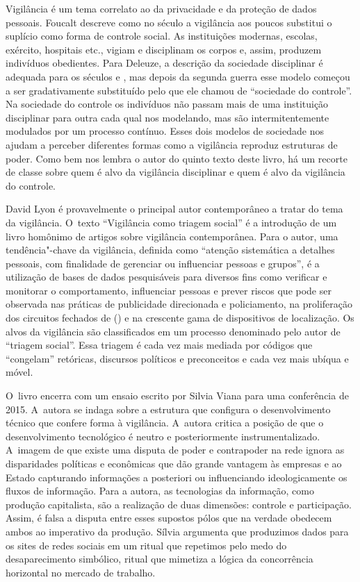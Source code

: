 Vigilância é um tema correlato ao da privacidade e da proteção de dados
pessoais. Foucalt descreve como no século  a vigilância aos poucos
substitui o suplício como forma de controle social. As instituições
modernas, escolas, exército, hospitais etc., vigiam e disciplinam os
corpos e, assim, produzem indivíduos obedientes. Para Deleuze, a
descrição da sociedade disciplinar é adequada para os séculos  e
, mas depois da segunda guerra esse modelo começou a ser
gradativamente substituído pelo que ele chamou de ``sociedade do
controle''. Na sociedade do controle os indivíduos não passam mais de
uma instituição disciplinar para outra cada qual nos modelando, mas são
intermitentemente modulados por um processo contínuo. Esses dois modelos
de sociedade nos ajudam a perceber diferentes formas como a vigilância
reproduz estruturas de poder. Como bem nos lembra o autor do quinto
texto deste livro, há um recorte de classe sobre quem é alvo da
vigilância disciplinar e quem é alvo da vigilância do controle.

David Lyon é provavelmente o principal autor contemporâneo a tratar do
tema da vigilância. O~texto ``Vigilância como triagem social'' é a
introdução de um livro homônimo de artigos sobre vigilância
contemporânea. Para o autor, uma tendência"-chave da vigilância, definida
como ``atenção sistemática a detalhes pessoais, com finalidade de
gerenciar ou influenciar pessoas e grupos'', é a utilização de bases de
dados pesquisáveis para diversos fins como verificar e monitorar o
comportamento, influenciar pessoas e prever riscos que pode ser
observada nas práticas de publicidade direcionada e policiamento, na
proliferação dos circuitos fechados de  () e na crescente gama de
dispositivos de localização. Os alvos da vigilância são classificados em
um processo denominado pelo autor de ``triagem social''. Essa triagem é
cada vez mais mediada por códigos que ``congelam'' retóricas, discursos
políticos e preconceitos e cada vez mais ubíqua e móvel.

O~livro encerra com um ensaio escrito por Silvia Viana para uma
conferência de 2015. A~autora se indaga sobre a estrutura que configura
o desenvolvimento técnico que confere forma à vigilância. A~autora
critica a posição de que o desenvolvimento tecnológico é neutro e
posteriormente instrumentalizado. A~imagem de que existe uma disputa de
poder e contrapoder na rede ignora as disparidades políticas e
econômicas que dão grande vantagem às empresas e ao Estado capturando
informações a posteriori ou influenciando ideologicamente os fluxos de
informação. Para a autora, as tecnologias da informação, como produção
capitalista, são a realização de duas dimensões: controle e
participação. Assim, é falsa a disputa entre esses supostos pólos que na
verdade obedecem ambos ao imperativo da produção. Sílvia argumenta que
produzimos dados para os sites de redes sociais em um ritual que
repetimos pelo medo do desaparecimento simbólico, ritual que mimetiza a
lógica da concorrência horizontal no mercado de trabalho.

